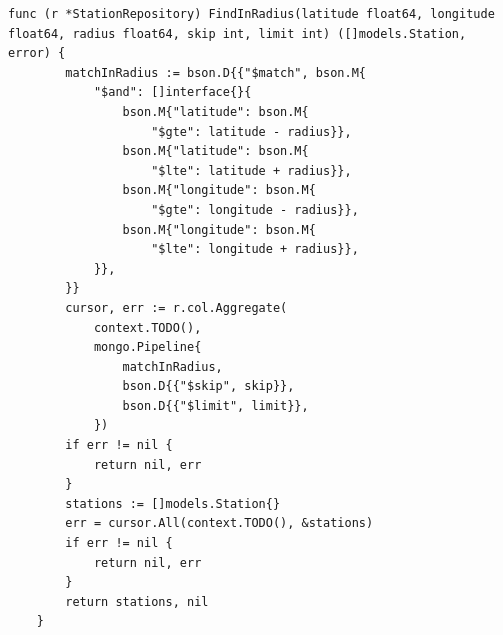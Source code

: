 \begin{lstlisting}[label=list:repo_read_station_FindInRadius,caption=Wyszukiwanie stacji ładowania w bazie danych w pobliżu podanych współrzędnych na mapie Ziemi.,basicstyle=\tiny\ttfamily]
    func (r *StationRepository) FindInRadius(latitude float64, longitude float64, radius float64, skip int, limit int) ([]models.Station, error) {
        matchInRadius := bson.D{{"$match", bson.M{
            "$and": []interface{}{
                bson.M{"latitude": bson.M{
                    "$gte": latitude - radius}},
                bson.M{"latitude": bson.M{
                    "$lte": latitude + radius}},
                bson.M{"longitude": bson.M{
                    "$gte": longitude - radius}},
                bson.M{"longitude": bson.M{
                    "$lte": longitude + radius}},
            }},
        }}
        cursor, err := r.col.Aggregate(
            context.TODO(),
            mongo.Pipeline{
                matchInRadius,
                bson.D{{"$skip", skip}},
                bson.D{{"$limit", limit}},
            })
        if err != nil {
            return nil, err
        }
        stations := []models.Station{}
        err = cursor.All(context.TODO(), &stations)
        if err != nil {
            return nil, err
        }
        return stations, nil
    }
\end{lstlisting}
